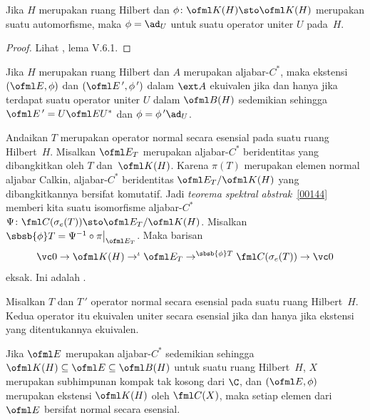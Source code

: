 \begin{prop}\label{005436} Jika $H$ merupakan ruang Hilbert dan $\phi\colon \ofml K(H) \sto \ofml K(H)$
merupakan suatu automorfisme, maka $\phi = \ad_U$ untuk suatu operator uniter $U$ pada~$H$.
\end{prop}

\begin{proof} Lihat \cite{Davidson:1996}, lema V.6.1.  \ns \end{proof}

\begin{prop} Jika $H$ merupakan ruang Hilbert dan $A$ merupakan aljabar-$C^*$, maka ekstensi
$(\ofml E,\phi)$ dan $(\ofml E\,',\phi\,')$ dalam $\ext A$ ekuivalen jika dan hanya jika
terdapat suatu operator uniter $U$ dalam $\ofml B(H)$ sedemikian sehingga $\ofml E\,' = U \ofml E
U^*$ dan $\phi = \phi\,' \ad_U$.
\end{prop}

\begin{exam} Andaikan $T$ merupakan operator normal secara esensial pada suatu ruang Hilbert~$H$. Misalkan
$\ofml E_T$ merupakan aljabar-$C^*$ beridentitas yang dibangkitkan oleh $T$ dan~$\ofml K(H)$. Karena
$\pi(T)$ merupakan elemen normal aljabar Calkin, aljabar-$C^*$ beridentitas $\ofml
E_T/\ofml K(H)$ yang dibangkitkannya bersifat komutatif. Jadi \emph{teorema spektral
abstrak}~\ref{00144} memberi kita suatu isomorfisme aljabar-$C^*$ $\Psi\colon \fml C(\sigma_e(T))
\sto \ofml E_T/\ofml K(H)$. Misalkan $\sbsb{\phi}T = \Psi^{-1} \circ\pi\bigr|_{\ofml E_T}$.
Maka barisan
  \[ \vc 0 \to \ofml K(H) \to^\iota \ofml E_T \to^{\sbsb{\phi}T} \fml C(\sigma_e(T)) \to \vc 0 \]
eksak. Ini adalah
.
\end{exam}

\begin{prop} Misalkan $T$ dan $T\,'$ operator normal secara esensial pada suatu ruang Hilbert~$H$. Kedua
operator itu ekuivalen uniter secara esensial jika dan hanya jika ekstensi yang
ditentukannya ekuivalen.
\end{prop}

\begin{prop} Jika $\ofml E$ merupakan aljabar-$C^*$ sedemikian sehingga $\ofml K(H) \subseteq \ofml E \subseteq
\ofml B(H)$ untuk suatu ruang Hilbert~$H$, $X$ merupakan subhimpunan kompak tak kosong dari $\C$, dan
$(\ofml E,\phi)$ merupakan ekstensi $\ofml K(H)$ oleh $\fml C(X)$, maka setiap elemen
dari $\ofml E$ bersifat normal secara esensial.
\end{prop}

